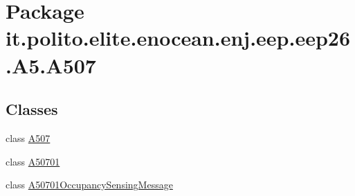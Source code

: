 \hypertarget{namespaceit_1_1polito_1_1elite_1_1enocean_1_1enj_1_1eep_1_1eep26_1_1_a5_1_1_a507}{}\section{Package it.\+polito.\+elite.\+enocean.\+enj.\+eep.\+eep26.\+A5.\+A507}
\label{namespaceit_1_1polito_1_1elite_1_1enocean_1_1enj_1_1eep_1_1eep26_1_1_a5_1_1_a507}
\subsection*{Classes}
\begin{DoxyCompactItemize}
\item 
class \hyperlink{classit_1_1polito_1_1elite_1_1enocean_1_1enj_1_1eep_1_1eep26_1_1_a5_1_1_a507_1_1_a507}{A507}
\item 
class \hyperlink{classit_1_1polito_1_1elite_1_1enocean_1_1enj_1_1eep_1_1eep26_1_1_a5_1_1_a507_1_1_a50701}{A50701}
\item 
class \hyperlink{classit_1_1polito_1_1elite_1_1enocean_1_1enj_1_1eep_1_1eep26_1_1_a5_1_1_a507_1_1_a50701_occupancy_sensing_message}{A50701\+Occupancy\+Sensing\+Message}
\end{DoxyCompactItemize}
